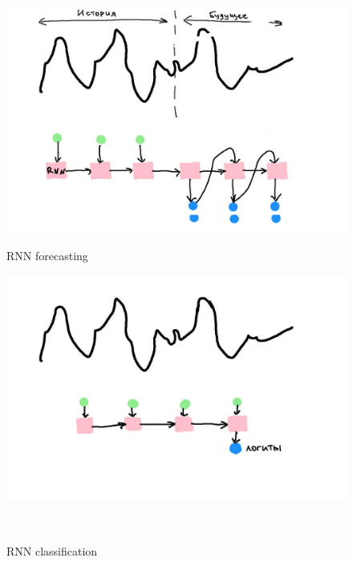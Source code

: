 \documentclass[12pt,fleqn]{article}
\begin{document}
\begin{figure}[!htb]
    \centering
    \begin{minipage}{0.45\linewidth}
        \centering
        \includegraphics[width=\linewidth]{illustrations/rnn-forecasting.jpg}
        \caption{RNN forecasting}
        \label{fig:mlp-forecasting}
    \end{minipage}
    \begin{minipage}{0.45\linewidth}
        \centering
        \includegraphics[width=\linewidth]{illustrations/rnn-clf-1.jpg}
        \caption{RNN classification}
        \label{fig:mlp-classification}
    \end{minipage}\\
    \begin{minipage}{0.45\linewidth}
        \centering

\end{minipage}
\end{figure}
\end{document}
